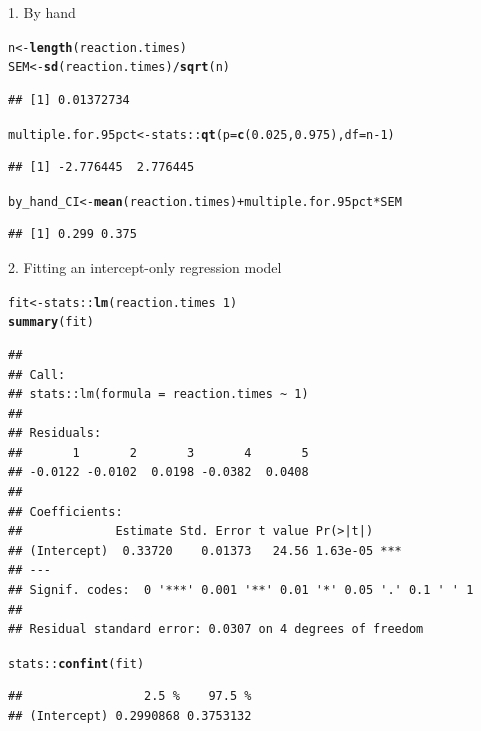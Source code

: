\documentclass{beamer}\usepackage[]{graphicx}\usepackage[]{color}
\newcommand{\hlnum}[1]{\textcolor[rgb]{0.686,0.059,0.569}{#1}}%
\newcommand{\hlopt}[1]{\textcolor[rgb]{0,0,0}{#1}}%
\newcommand{\hlstd}[1]{\textcolor[rgb]{0.345,0.345,0.345}{#1}}%
\newcommand{\hlkwb}[1]{\textcolor[rgb]{0.69,0.353,0.396}{#1}}%
\newcommand{\hlkwc}[1]{\textcolor[rgb]{0.333,0.667,0.333}{#1}}%
\newcommand{\hlkwd}[1]{\textcolor[rgb]{0.737,0.353,0.396}{\textbf{#1}}}%
\newenvironment{knitrout}{}{} %
\begin{document}
\begin{frame}[fragile]{1. By hand }
\begin{knitrout}\scriptsize
{}\color{fgcolor}
\begin{alltt}
\hlstd{n} \hlkwb{<-} \hlkwd{length}\hlstd{(reaction.times)}
\hlstd{SEM} \hlkwb{<-} \hlkwd{sd}\hlstd{(reaction.times)}\hlopt{/}\hlkwd{sqrt}\hlstd{(n)}
\end{alltt}
\begin{verbatim}
## [1] 0.01372734
\end{verbatim}
\begin{alltt}
\hlstd{multiple.for.95pct} \hlkwb{<-} \hlstd{stats}\hlopt{::}\hlkwd{qt}\hlstd{(}\hlkwc{p} \hlstd{=} \hlkwd{c}\hlstd{(}\hlnum{0.025}\hlstd{,} \hlnum{0.975}\hlstd{),} \hlkwc{df} \hlstd{= n}\hlopt{-}\hlnum{1}\hlstd{)}
\end{alltt}
\begin{verbatim}
## [1] -2.776445  2.776445
\end{verbatim}
\begin{alltt}
\hlstd{by_hand_CI} \hlkwb{<-} \hlkwd{mean}\hlstd{(reaction.times)} \hlopt{+} \hlstd{multiple.for.95pct} \hlopt{*} \hlstd{SEM}
\end{alltt}
\begin{verbatim}
## [1] 0.299 0.375
\end{verbatim}

\end{knitrout}
\end{frame}




\begin{frame}[fragile]{2. Fitting an intercept-only regression model}
\begin{knitrout}\scriptsize
{}\color{fgcolor}
\begin{alltt}
\hlstd{fit} \hlkwb{<-} \hlstd{stats}\hlopt{::}\hlkwd{lm}\hlstd{(reaction.times} \hlopt{~} \hlnum{1}\hlstd{)}
\hlkwd{summary}\hlstd{(fit)}
\end{alltt}
\begin{verbatim}
## 
## Call:
## stats::lm(formula = reaction.times ~ 1)
## 
## Residuals:
##       1       2       3       4       5 
## -0.0122 -0.0102  0.0198 -0.0382  0.0408 
## 
## Coefficients:
##             Estimate Std. Error t value Pr(>|t|)    
## (Intercept)  0.33720    0.01373   24.56 1.63e-05 ***
## ---
## Signif. codes:  0 '***' 0.001 '**' 0.01 '*' 0.05 '.' 0.1 ' ' 1
## 
## Residual standard error: 0.0307 on 4 degrees of freedom
\end{verbatim}
\begin{alltt}
\hlstd{stats}\hlopt{::}\hlkwd{confint}\hlstd{(fit)}
\end{alltt}
\begin{verbatim}
##                 2.5 %    97.5 %
## (Intercept) 0.2990868 0.3753132
\end{verbatim}

\end{knitrout}
\end{frame}
\end{document}
